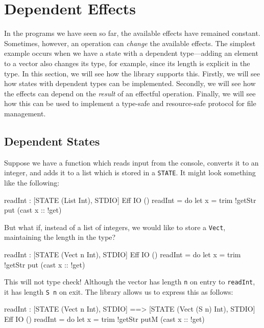 \section{Dependent Effects}

\label{sect:depeff}

In the programs we have seen so far, the available effects have remained
constant. Sometimes, however, an operation can \emph{change} the available
effects. The simplest example occurs when we have a state with a dependent
type---adding an element to a vector also changes its type, for example,
since its length is explicit in the type. In this section, we will see how
the \effects{} library supports this. Firstly, we will see how states with
dependent types can be implemented. Secondly, we will see how the effects
can depend on the \emph{result} of an effectful operation. Finally, we will
see how this can be used to implement a type-safe and resource-safe protocol
for file management.

\subsection{Dependent States}

Suppose we have a function which reads input from the console, converts it
to an integer, and adds it to a list which is stored in a \texttt{STATE}.
It might look something like the following:

\begin{code}
readInt : { [STATE (List Int), STDIO] } Eff IO ()
readInt = do let x = trim !getStr
             put (cast x :: !get)
\end{code}

\noindent
But what if, instead of a list of integers, we would like to store a
\texttt{Vect}, maintaining the length in the type?

\begin{code}
readInt : { [STATE (Vect n Int), STDIO] } Eff IO ()
readInt = do let x = trim !getStr
             put (cast x :: !get)
\end{code}

\noindent
This will not type check! Although the vector has length \texttt{n} on
entry to \texttt{readInt}, it has length \texttt{S n} on exit. The
\effects{} library allows us to express this as follows:

\begin{code}
readInt : { [STATE (Vect n Int), STDIO] ==>
            [STATE (Vect (S n) Int), STDIO] } Eff IO ()
readInt = do let x = trim !getStr
             putM (cast x :: !get)
\end{code}

